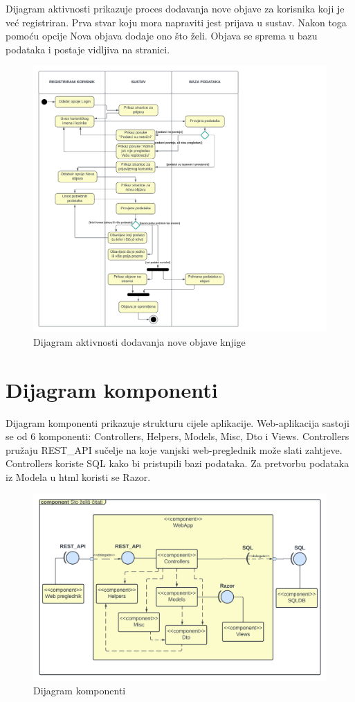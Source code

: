			\raggedright{Dijagram aktivnosti prikazuje proces dodavanja nove objave za korisnika koji je već registriran. Prva stvar koju mora napraviti jest prijava u sustav. Nakon toga pomoću opcije Nova objava dodaje ono što želi. Objava se sprema u bazu podataka i postaje vidljiva na stranici.}\\
			
			\begin{figure}[h]
				\centering
				\includegraphics[width = \textwidth]{slike/dijagram_akt.PNG}
				\caption{Dijagram aktivnosti dodavanja nove objave knjige}
				\label{fig:enter-label}
			\end{figure}
			\eject
			
		\section{Dijagram komponenti}
		
			\raggedright{Dijagram komponenti prikazuje strukturu cijele aplikacije. Web-aplikacija sastoji se od 6 komponenti: Controllers, Helpers, Models, Misc, Dto i Views. Controllers pružaju REST\_API sučelje na koje vanjski web-preglednik može slati zahtjeve. Controllers koriste SQL kako bi pristupili bazi podataka. Za pretvorbu podataka iz Modela u html koristi se Razor.}\\
			
			\begin{figure}[h]
				\centering
				\includegraphics[width = \textwidth]{slike/dijagram_komp.PNG}
				\caption{Dijagram komponenti}
				\label{fig:enter-label}
			\end{figure}
			\eject
			